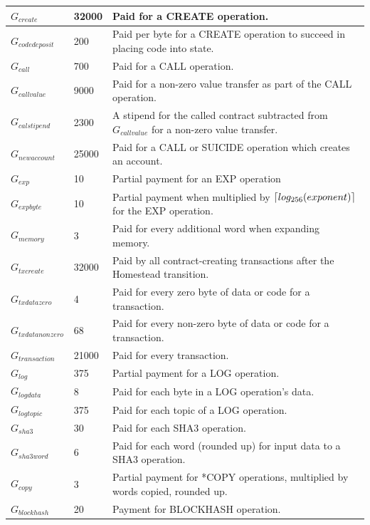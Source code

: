 \documentclass{article}
\DeclarePairedDelimiter{\ceil}{\lceil}{\rceil}
\begin{document}
\begin{table}[!ht]
\begin{tabular}{| l | l | p{8cm} |}
			$G_{create}$ 		& 32000		& Paid for a CREATE operation. \\ \hline
			$G_{codedeposit}$ 	& 200 		& Paid per byte for a CREATE operation to succeed in placing code into state. \\ \hline
			$G_{call}$ 			& 700		& Paid for a CALL operation. \\ \hline
			$G_{callvalue}$ 	& 9000		& Paid for a non-zero value transfer as part of the CALL operation. \\ \hline
			$G_{calstipend}$ 	& 2300		& A stipend for the called contract subtracted from $G_{callvalue}$ for a non-zero value transfer. \\ \hline
			$G_{newaccount}$ 	& 25000		& Paid for a CALL or SUICIDE operation which creates an account. \\ \hline
			$G_{exp}$ 			& 10 		& Partial payment for an EXP operation \\ \hline
			$G_{expbyte}$ 		& 10		& Partial payment when multiplied by $\ceil{log_{256}(exponent)}$  for the EXP operation. 	 \\ \hline
			$G_{memory}$ 		& 3			& Paid for every additional word when expanding memory. \\ \hline
			$G_{txcreate}$ 		& 32000		& Paid by all contract-creating transactions after the Homestead transition. \\ \hline
			$G_{txdatazero}$ 	& 4 		& Paid for every zero byte of data or code for a transaction. \\ \hline
			$G_{txdatanonzero}$ & 68		& Paid for every non-zero byte of data or code for a transaction. \\ \hline
			$G_{transaction}$ 	& 21000		& Paid for every transaction. \\ \hline
			$G_{log}$ 			& 375 		& Partial payment for a LOG operation. \\ \hline
			$G_{logdata}$ 		& 8			& Paid for each byte in a LOG operation's data. \\ \hline
			$G_{logtopic}$ 		& 375		& Paid for each topic of a LOG operation. \\ \hline
			$G_{sha3}$ 			& 30		& Paid for each SHA3 operation. \\ \hline
			$G_{sha3word}$ 		& 6			& Paid for each word (rounded up) for input data to a SHA3 operation. \\ \hline
			$G_{copy}$ 			& 3			& Partial payment for *COPY operations, multiplied by words copied, rounded up. \\ \hline
			$G_{blockhash}$ 	& 20		& Payment for BLOCKHASH operation. \\ 
			\hline
		\end{tabular}
		\end{table}
		\FloatBarrier
\end{document}

